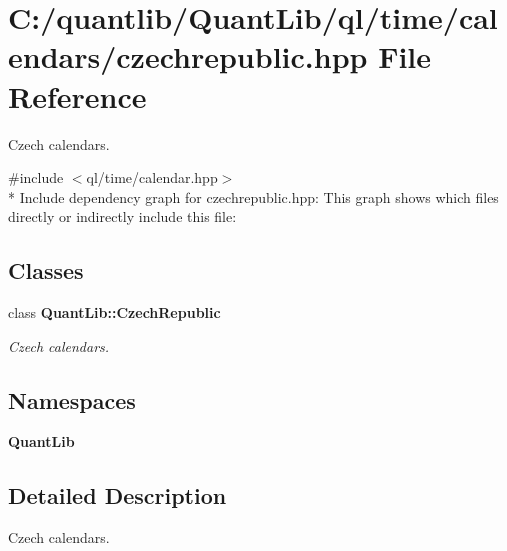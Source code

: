 \section{C\+:/quantlib/\+Quant\+Lib/ql/time/calendars/czechrepublic.hpp File Reference}
\label{czechrepublic_8hpp}


Czech calendars.  


{\ttfamily \#include $<$ql/time/calendar.\+hpp$>$}\\*
Include dependency graph for czechrepublic.\+hpp\+:
This graph shows which files directly or indirectly include this file\+:
\subsection*{Classes}
\begin{DoxyCompactItemize}
\item 
class {\bf Quant\+Lib\+::\+Czech\+Republic}
\begin{DoxyCompactList}\small\item\em Czech calendars. \end{DoxyCompactList}\end{DoxyCompactItemize}
\subsection*{Namespaces}
\begin{DoxyCompactItemize}
\item 
 {\bf Quant\+Lib}
\end{DoxyCompactItemize}


\subsection{Detailed Description}
Czech calendars. 

